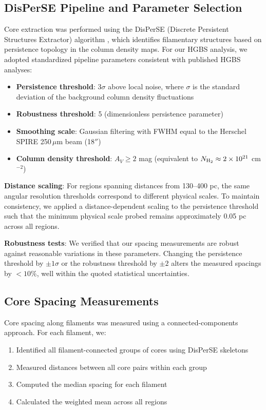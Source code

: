 \documentclass[11pt,a4paper]{article}
\begin{document}
\subsection{DisPerSE Pipeline and Parameter Selection}

Core extraction was performed using the DisPerSE (Discrete Persistent Structures Extractor) algorithm \citep{Sousbie2011}, which identifies filamentary structures based on persistence topology in the column density maps. For our HGBS analysis, we adopted standardized pipeline parameters consistent with published HGBS analyses:

\begin{itemize}
    \item \textbf{Persistence threshold}: $3\sigma$ above local noise, where $\sigma$ is the standard deviation of the background column density fluctuations
    \item \textbf{Robustness threshold}: 5 (dimensionless persistence parameter)
    \item \textbf{Smoothing scale}: Gaussian filtering with FWHM equal to the Herschel SPIRE 250\,$\mu$m beam (18$''$)
    \item \textbf{Column density threshold}: $A_V \geq 2$ mag (equivalent to $N_{\rm H_2} \approx 2 \times 10^{21}$ cm$^{-2}$)
\end{itemize}

\textbf{Distance scaling}: For regions spanning distances from 130--400 pc, the same angular resolution thresholds correspond to different physical scales. To maintain consistency, we applied a distance-dependent scaling to the persistence threshold such that the minimum physical scale probed remains approximately 0.05 pc across all regions.

\textbf{Robustness tests}: We verified that our spacing measurements are robust against reasonable variations in these parameters. Changing the persistence threshold by $\pm 1\sigma$ or the robustness threshold by $\pm 2$ alters the measured spacings by $<10\%$, well within the quoted statistical uncertainties.

\subsection{Core Spacing Measurements}

Core spacing along filaments was measured using a connected-components approach. For each filament, we:
\begin{enumerate}
    \item Identified all filament-connected groups of cores using DisPerSE skeletons
    \item Measured distances between all core pairs within each group
    \item Computed the median spacing for each filament
    \item Calculated the weighted mean across all regions
\end{enumerate}
\end{document}
